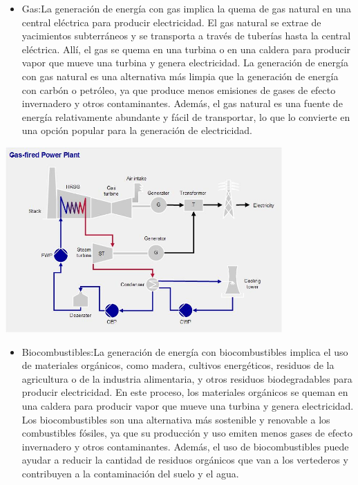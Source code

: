 \documentclass[
]{article}
\providecommand{\tightlist}{%
  \setlength{\itemsep}{0pt}\setlength{\parskip}{0pt}}
\begin{document}
\begin{itemize}
\tightlist
\item
  Gas:La generación de energía con gas implica la quema de gas natural
  en una central eléctrica para producir electricidad. El gas natural se
  extrae de yacimientos subterráneos y se transporta a través de
  tuberías hasta la central eléctrica. Allí, el gas se quema en una
  turbina o en una caldera para producir vapor que mueve una turbina y
  genera electricidad. La generación de energía con gas natural es una
  alternativa más limpia que la generación de energía con carbón o
  petróleo, ya que produce menos emisiones de gases de efecto
  invernadero y otros contaminantes. Además, el gas natural es una
  fuente de energía relativamente abundante y fácil de transportar, lo
  que lo convierte en una opción popular para la generación de
  electricidad.
\end{itemize}

\includegraphics[width=4.16667in,height=\textheight]{gas.jpeg}

\begin{itemize}
\tightlist
\item
  Biocombustibles:La generación de energía con biocombustibles implica
  el uso de materiales orgánicos, como madera, cultivos energéticos,
  residuos de la agricultura o de la industria alimentaria, y otros
  residuos biodegradables para producir electricidad. En este proceso,
  los materiales orgánicos se queman en una caldera para producir vapor
  que mueve una turbina y genera electricidad. Los biocombustibles son
  una alternativa más sostenible y renovable a los combustibles fósiles,
  ya que su producción y uso emiten menos gases de efecto invernadero y
  otros contaminantes. Además, el uso de biocombustibles puede ayudar a
  reducir la cantidad de residuos orgánicos que van a los vertederos y
  contribuyen a la contaminación del suelo y el agua.
\end{itemize}
\end{document}

